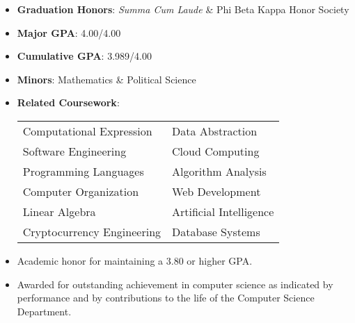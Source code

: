 \documentclass[10pt,a4paper,ragged2e]{altacv}
\begin{document}
\begin{itemize}
  \item \textbf{Graduation Honors}: \emph{Summa Cum Laude}  \& Phi Beta Kappa Honor Society
  \item \textbf{Major GPA}: 4.00/4.00
  \item \textbf{Cumulative GPA}: 3.989/4.00
  \item \textbf{Minors}: Mathematics \& Political Science
  \item \textbf{Related Coursework}:
        \begin{center}
          \begin{tabular}{l l}
            Computational Expression   & Data Abstraction        \\
            Software Engineering       & Cloud Computing         \\
            Programming Languages      & Algorithm Analysis      \\
            Computer Organization      & Web Development         \\
            Linear Algebra             & Artificial Intelligence \\
            Cryptocurrency Engineering & Database Systems        \\
          \end{tabular}

        \end{center}

\end{itemize}
\begin{itemize}
  \item Academic honor for maintaining a 3.80 or higher GPA.
\end{itemize}

\begin{itemize}
  \item Awarded for outstanding achievement in computer science as indicated by
        performance and by contributions to the life of the Computer Science Department.
\end{itemize}
\end{document}
